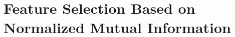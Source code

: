 \documentclass[document.tex]{subfiles}
\begin{document}
\section{Feature Selection Based on Normalized Mutual Information}
%
\end{document}
